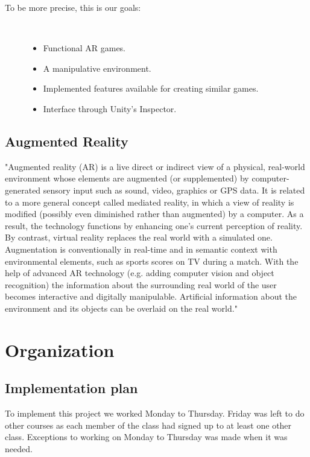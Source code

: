 \begin{description}
	\item[To be more precise, this is our goals:]\ 
	\begin{itemize}
		\item Functional \gls{AR} games.
		\item A manipulative environment.
		\item Implemented features available for creating similar games. 
		\item Interface through Unity's \gls{Inspector}.
	\end{itemize}
\end{description}


\subsection{Augmented Reality}
"Augmented reality (AR) is a live direct or indirect view of a physical, real-world environment whose elements are augmented (or supplemented) by computer-generated sensory input such as sound, video, graphics or GPS data. It is related to a more general concept called mediated reality, in which a view of reality is modified (possibly even diminished rather than augmented) by a computer. As a result, the technology functions by enhancing one's current perception of reality. By contrast, virtual reality replaces the real world with a simulated one. Augmentation is conventionally in real-time and in semantic context with environmental elements, such as sports scores on TV during a match. With the help of advanced AR technology (e.g. adding computer vision and object recognition) the information about the surrounding real world of the user becomes interactive and digitally manipulable. Artificial information about the environment and its objects can be overlaid on the real world."\cite{WikiAugmentedReality}



\section{Organization}

\subsection{Implementation plan}
To implement this project we worked Monday to Thursday.
Friday was left to do other courses as each member of the class had signed up to at least one other class.
Exceptions to working on Monday to Thursday was made when it was needed.

